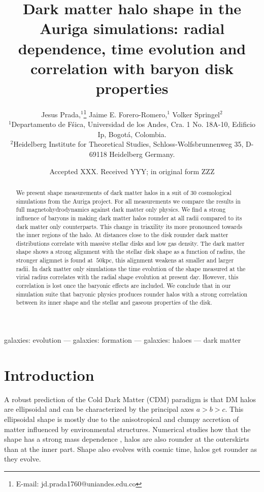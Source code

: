 \documentclass[a4paper,fleqn,usenatbib]{mnras}
\title[The shape of dark matter haloes in the Auriga simulations]
{Dark matter halo shape in the Auriga simulations: radial
  dependence, time evolution and correlation with baryon disk
  properties}
\author[Jesus Prada,  Jaime E. Forero-Romero, Volker Springel ]{
Jesus Prada,$^{1}$\thanks{E-mail: jd.prada1760@uniandes.edu.co}
Jaime E. Forero-Romero,$^{1}$
Volker Springel$^{2}$
\\
$^{1}$Departamento de F\'sica, Universidad de los Andes, Cra. 1 No.
18A-10, Edificio Ip, Bogot\'a, Colombia.\\
$^{2}$Heidelberg Institute for Theoretical Studies, Schloss-Wolfsbrunnenweg 35, D-69118 Heidelberg
Germany.\\
}
\date{Accepted XXX. Received YYY; in original form ZZZ}
\begin{document}
\label{firstpage}
\pagerange{\pageref{firstpage}--\pageref{lastpage}}
\maketitle

\begin{abstract}
We present shape measurements of dark matter halos in a suit
of 30 cosmological simulations from the Auriga project.
For all measurements we compare the results in full
magnetohydrodynamics against dark matter only physics.
We find a strong influence of baryons in making dark matter halos rounder at all
radii compared to its dark matter only counterparts.
This change in triaxility its more pronounced towards the inner
regions of the halo.
At distances close to the disk rounder dark matter distributions
correlate with massive stellar disks and low gas density.
The dark matter shape shows a strong alignment with the
stellar disk shape as a function of radius, the stronger aligmnet is
found at $~50$kpc, this alignment weakens at smaller and larger radii. 
In dark matter only simulations the time evolution of the shape
measured at the virial radius correlates with the radial shape
evolution at present day.  
However, this correlation is lost once the baryonic effects are
included. 
We conclude that in our simulation suite that baryonic physics
produces rounder halos with a strong correlation between its inner
shape and the stellar and gaseous properties of the disk.
\end{abstract}

\begin{keywords}
galaxies: evolution --- galaxies: formation --- galaxies: haloes ---
dark matter
\end{keywords}



\section{Introduction}


A robust prediction of the Cold Dark Matter (CDM) paradigm is that DM
halos are ellipsoidal and can be characterized by the principal axes
$a>b>c$.
This ellipsoidal shape is mostly due to the anisotropical and
clumpy accretion of matter influenced by environmental structures.
Numerical studies how that the shape has a strong mass dependence
\citep{Allgood_et_al._2006}, halos are also rounder at the outerskirts
than at the inner part. 
Shape also evolves with cosmic time, halos get
rounder as they evolve.  
\end{document}
